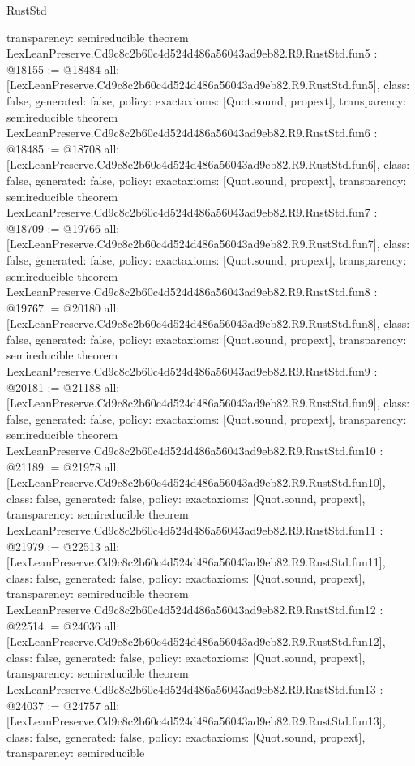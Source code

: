 \begin{lexlean}{RustStd}
\begin{coremodule}
{  transparency: semireducible
}
theorem LexLeanPreserve.Cd9c8c2b60c4d524d486a56043ad9eb82.R9.RustStd.fun5 : @18155 := @18484 {
  all: [LexLeanPreserve.Cd9c8c2b60c4d524d486a56043ad9eb82.R9.RustStd.fun5],
  class: false,
  generated: false,
  policy: exact{axioms: [Quot.sound, propext]},
  transparency: semireducible
}
theorem LexLeanPreserve.Cd9c8c2b60c4d524d486a56043ad9eb82.R9.RustStd.fun6 : @18485 := @18708 {
  all: [LexLeanPreserve.Cd9c8c2b60c4d524d486a56043ad9eb82.R9.RustStd.fun6],
  class: false,
  generated: false,
  policy: exact{axioms: [Quot.sound, propext]},
  transparency: semireducible
}
theorem LexLeanPreserve.Cd9c8c2b60c4d524d486a56043ad9eb82.R9.RustStd.fun7 : @18709 := @19766 {
  all: [LexLeanPreserve.Cd9c8c2b60c4d524d486a56043ad9eb82.R9.RustStd.fun7],
  class: false,
  generated: false,
  policy: exact{axioms: [Quot.sound, propext]},
  transparency: semireducible
}
theorem LexLeanPreserve.Cd9c8c2b60c4d524d486a56043ad9eb82.R9.RustStd.fun8 : @19767 := @20180 {
  all: [LexLeanPreserve.Cd9c8c2b60c4d524d486a56043ad9eb82.R9.RustStd.fun8],
  class: false,
  generated: false,
  policy: exact{axioms: [Quot.sound, propext]},
  transparency: semireducible
}
theorem LexLeanPreserve.Cd9c8c2b60c4d524d486a56043ad9eb82.R9.RustStd.fun9 : @20181 := @21188 {
  all: [LexLeanPreserve.Cd9c8c2b60c4d524d486a56043ad9eb82.R9.RustStd.fun9],
  class: false,
  generated: false,
  policy: exact{axioms: [Quot.sound, propext]},
  transparency: semireducible
}
theorem LexLeanPreserve.Cd9c8c2b60c4d524d486a56043ad9eb82.R9.RustStd.fun10 : @21189 := @21978 {
  all: [LexLeanPreserve.Cd9c8c2b60c4d524d486a56043ad9eb82.R9.RustStd.fun10],
  class: false,
  generated: false,
  policy: exact{axioms: [Quot.sound, propext]},
  transparency: semireducible
}
theorem LexLeanPreserve.Cd9c8c2b60c4d524d486a56043ad9eb82.R9.RustStd.fun11 : @21979 := @22513 {
  all: [LexLeanPreserve.Cd9c8c2b60c4d524d486a56043ad9eb82.R9.RustStd.fun11],
  class: false,
  generated: false,
  policy: exact{axioms: [Quot.sound, propext]},
  transparency: semireducible
}
theorem LexLeanPreserve.Cd9c8c2b60c4d524d486a56043ad9eb82.R9.RustStd.fun12 : @22514 := @24036 {
  all: [LexLeanPreserve.Cd9c8c2b60c4d524d486a56043ad9eb82.R9.RustStd.fun12],
  class: false,
  generated: false,
  policy: exact{axioms: [Quot.sound, propext]},
  transparency: semireducible
}
theorem LexLeanPreserve.Cd9c8c2b60c4d524d486a56043ad9eb82.R9.RustStd.fun13 : @24037 := @24757 {
  all: [LexLeanPreserve.Cd9c8c2b60c4d524d486a56043ad9eb82.R9.RustStd.fun13],
  class: false,
  generated: false,
  policy: exact{axioms: [Quot.sound, propext]},
  transparency: semireducible
}
\end{coremodule}
\end{lexlean}
